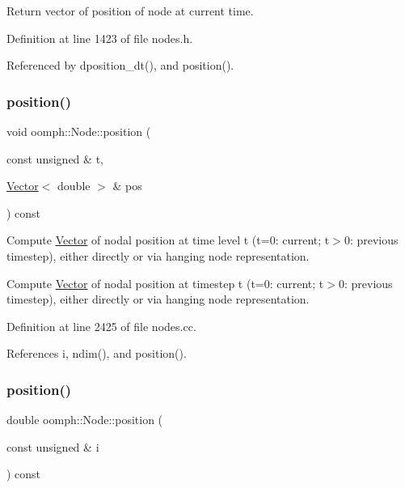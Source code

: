 Return vector of position of node at current time. 



Definition at line 1423 of file nodes.\+h.



Referenced by dposition\+\_\+dt(), and position().

\mbox{\label{classoomph_1_1Node_abc8756948b04cb82f9f32a44ef9c69f9}} 
\subsubsection{\texorpdfstring{position()}{position()}\hspace{0.1cm}{\footnotesize\ttfamily [3/5]}}
{\footnotesize\ttfamily void oomph\+::\+Node\+::position (\begin{DoxyParamCaption}\item[{const unsigned \&}]{t,  }\item[{\hyperlink{classoomph_1_1Vector}{Vector}$<$ double $>$ \&}]{pos }\end{DoxyParamCaption}) const}



Compute \hyperlink{classoomph_1_1Vector}{Vector} of nodal position at time level t (t=0\+: current; t$>$0\+: previous timestep), either directly or via hanging node representation. 

Compute \hyperlink{classoomph_1_1Vector}{Vector} of nodal position at timestep t (t=0\+: current; t$>$0\+: previous timestep), either directly or via hanging node representation. 

Definition at line 2425 of file nodes.\+cc.



References i, ndim(), and position().

\mbox{\label{classoomph_1_1Node_a05963e00bfc7dd92399a5b2230f77032}} 
\subsubsection{\texorpdfstring{position()}{position()}\hspace{0.1cm}{\footnotesize\ttfamily [4/5]}}
{\footnotesize\ttfamily double oomph\+::\+Node\+::position (\begin{DoxyParamCaption}\item[{const unsigned \&}]{i }\end{DoxyParamCaption}) const}



